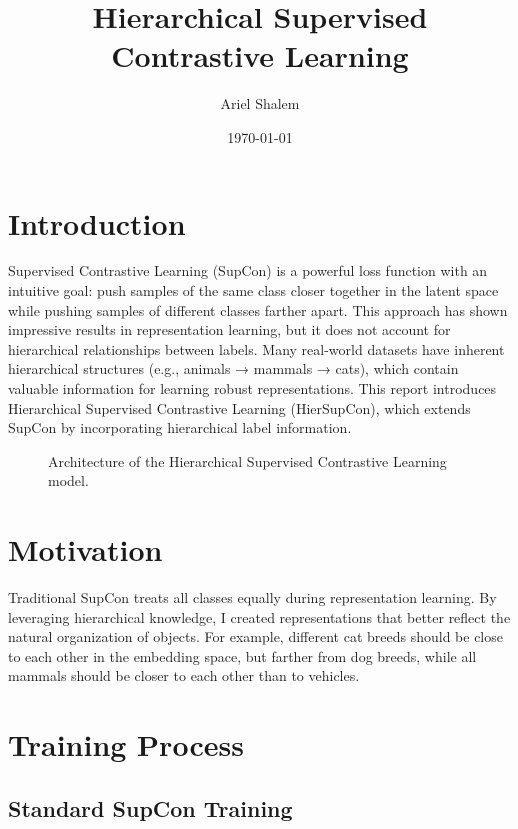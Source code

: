 \documentclass[10pt,a4paper]{article}
\title{Hierarchical Supervised Contrastive Learning}
\author{Ariel Shalem}
\date{\today}
\begin{document}
\maketitle

\section{Introduction}

Supervised Contrastive Learning (SupCon) \cite{khosla2020supervised} is a powerful loss function with an intuitive goal: push samples of the same class closer together in the latent space while pushing samples of different classes farther apart. This approach has shown impressive results in representation learning, but it does not account for hierarchical relationships between labels. Many real-world datasets have inherent hierarchical structures (e.g., animals → mammals → cats), which contain valuable information for learning robust representations. This report introduces Hierarchical Supervised Contrastive Learning (HierSupCon), which extends SupCon by incorporating hierarchical label information.

\begin{figure}[h]
\centering
{}
\caption{Architecture of the Hierarchical Supervised Contrastive Learning model.}
\label{fig:architecture}
\end{figure}

\section{Motivation}

Traditional SupCon treats all classes equally during representation learning. By leveraging hierarchical knowledge, I created representations that better reflect the natural organization of objects. For example, different cat breeds should be close to each other in the embedding space, but farther from dog breeds, while all mammals should be closer to each other than to vehicles.

\section{Training Process}

\subsection{Standard SupCon Training}
\end{document}
